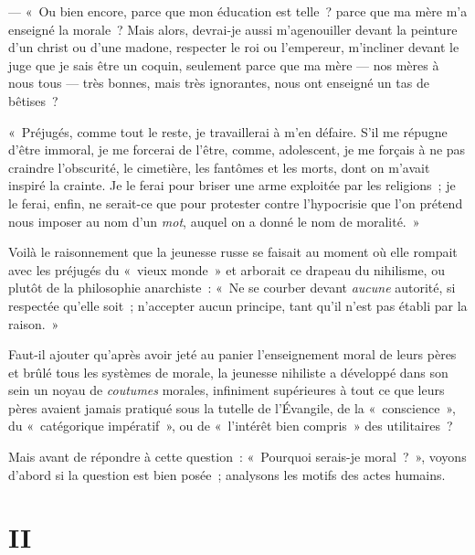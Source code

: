 \documentclass[french,twoside]{book} %
\begin{document}
— « Ou bien encore, parce que mon éducation est telle ? parce que ma mère m’a enseigné la morale ? Mais alors, devrai-je aussi m’agenouiller devant la peinture d’un christ ou d’une madone, respecter le roi ou l’empereur, m’incliner devant le juge que je sais être un coquin, seulement parce que ma mère — nos mères à nous tous — très bonnes, mais très ignorantes, nous ont enseigné un tas de bêtises ?\par
« Préjugés, comme tout le reste, je travaillerai à m’en défaire. S’il me répugne d’être immoral, je me forcerai de l’être, comme, adolescent, je me forçais à ne pas craindre l’obscurité, le cimetière, les fantômes et les morts, dont on m’avait inspiré la crainte. Je le ferai pour briser une arme exploitée par les religions ; je le ferai, enfin, ne serait-ce que  pour protester contre l’hypocrisie que l’on prétend nous imposer au nom d’un \emph{mot}, auquel on a donné le nom de moralité. »\par
\bigbreak
\noindent Voilà le raisonnement que la jeunesse russe se faisait au moment où elle rompait avec les préjugés du « vieux monde » et arborait ce drapeau du nihilisme, ou plutôt de la philosophie anarchiste : « Ne se courber devant \emph{aucune} autorité, si respectée qu’elle soit ; n’accepter aucun principe, tant qu’il n’est pas établi par la raison. »\par
Faut-il ajouter qu’après avoir jeté au panier l’enseignement moral de leurs pères et brûlé tous les systèmes de morale, la jeunesse nihiliste a développé dans son sein un noyau de \emph{coutumes} morales, infiniment supérieures à tout ce que leurs pères avaient jamais pratiqué sous la tutelle de l’Évangile, de la « conscience », du « catégorique impératif », ou de « l’intérêt bien compris » des utilitaires ?\par
Mais avant de répondre à cette question : « Pourquoi serais-je moral ? », voyons d’abord si la question est bien posée ; analysons les motifs des actes humains.
\section[{II}]{II}
\label{p02}\renewcommand{\leftmark}{II}
\end{document}
